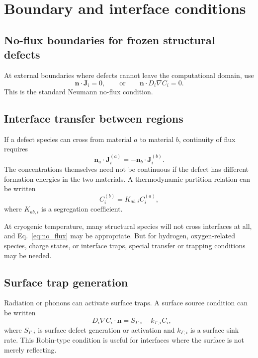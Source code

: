 \documentclass[11pt]{article}
\newcommand{\Jdef}{\mathbf{J}}
\newcommand{\nvecb}{\mathbf{n}}
\begin{document}
\section{Boundary and interface conditions}

\subsection{No-flux boundaries for frozen structural defects}

At external boundaries where defects cannot leave the computational domain, use
\begin{equation}
\nvecb\cdot \Jdef_i=0,
\qquad
\text{or}
\qquad
\nvecb\cdot D_i\nabla C_i=0.
\label{eq:no_flux}
\end{equation}
This is the standard Neumann no-flux condition.

\subsection{Interface transfer between regions}

If a defect species can cross from material $a$ to material $b$, continuity of flux requires
\begin{equation}
\nvecb_a\cdot \Jdef_i^{(a)}=-\nvecb_b\cdot \Jdef_i^{(b)}.
\label{eq:flux_continuity}
\end{equation}
The concentrations themselves need not be continuous if the defect has different formation energies in the two materials. A thermodynamic partition relation can be written
\begin{equation}
C_i^{(b)}=K_{ab,i} C_i^{(a)},
\label{eq:partition_condition}
\end{equation}
where $K_{ab,i}$ is a segregation coefficient.

At cryogenic temperature, many structural species will not cross interfaces at all, and Eq.~\eqref{eq:no_flux} may be appropriate. But for hydrogen, oxygen-related species, charge states, or interface traps, special transfer or trapping conditions may be needed.

\subsection{Surface trap generation}

Radiation or phonons can activate surface traps. A surface source condition can be written
\begin{equation}
-D_i\nabla C_i\cdot \nvecb = S_{\Gamma,i} - k_{\Gamma,i} C_i,
\label{eq:surface_source_sink}
\end{equation}
where $S_{\Gamma,i}$ is surface defect generation or activation and $k_{\Gamma,i}$ is a surface sink rate. This Robin-type condition is useful for interfaces where the surface is not merely reflecting.
\end{document}
